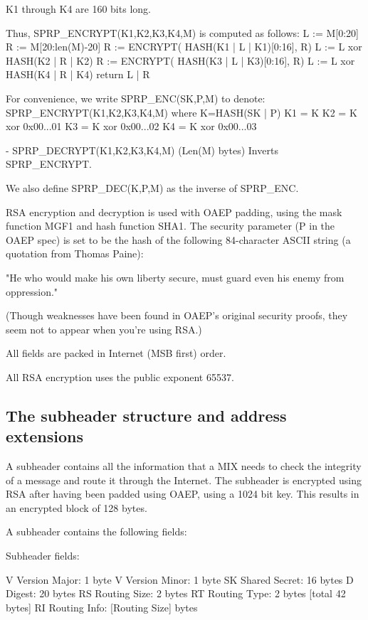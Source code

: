   K1 through K4 are 160 bits long.

  Thus, SPRP_ENCRYPT(K1,K2,K3,K4,M) is computed as follows:
            L := M[0:20]
            R := M[20:len(M)-20]
            R := ENCRYPT( HASH(K1 | L | K1)[0:16], R)
            L := L xor HASH(K2 | R | K2)
            R := ENCRYPT( HASH(K3 | L | K3)[0:16], R)
            L := L xor HASH(K4 | R | K4) 
            return L | R

  For convenience, we write SPRP_ENC(SK,P,M) to denote:
       SPRP_ENCRYPT(K1,K2,K3,K4,M)
       where K=HASH(SK | P)
             K1 = K
             K2 = K xor 0x00...01
             K3 = K xor 0x00...02
             K4 = K xor 0x00...03

- SPRP_DECRYPT(K1,K2,K3,K4,M) (Len(M) bytes) Inverts SPRP_ENCRYPT.

  We also define SPRP_DEC(K,P,M) as the inverse of SPRP_ENC.

RSA encryption and decryption is used with OAEP padding, using the
mask function MGF1 and hash function SHA1.  The security parameter (P
in the OAEP spec) is set to be the hash of the following 84-character
ASCII string (a quotation from Thomas Paine):

     "He who would make his own liberty secure, must guard even his
      enemy from oppression." 

(Though weaknesses have been found in OAEP's original security proofs,
they seem not to appear when you're using RSA.)

All fields are packed in Internet (MSB first) order.

All RSA encryption uses the public exponent 65537.

\subsection{The subheader structure and address extensions}

A subheader contains all the information that a MIX needs to check the
integrity of a message and route it through the Internet. The subheader
is encrypted using RSA after having been padded using OAEP, using a 1024
bit key. This results in an encrypted block of 128 bytes.

A subheader contains the following fields:

Subheader fields:

V   Version Major:   1 byte
V   Version Minor:   1 byte
SK  Shared Secret:   16 bytes
D   Digest:          20 bytes
RS  Routing Size:    2 bytes 
RT  Routing Type:    2 bytes [total 42 bytes]
RI  Routing Info:    [Routing Size] bytes


